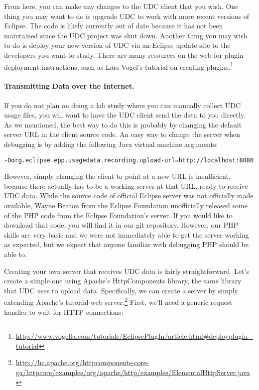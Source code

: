 From here, you can make any changes to the UDC client that you wish.
One thing you may want to do is upgrade UDC to work with more recent versions
of Eclipse.
The code is likely currently out of date
because it has not been maintained since the UDC project was shut down.
Another thing you may wish to do is deploy your new version of UDC via
an Eclipse update site to the developers you want to study.
There are many resources on the web for plugin deployment instructions,
such as Lars Vogel's tutorial on creating 
plugins.\footnote{\url{http://www.vogella.com/tutorials/EclipsePlugIn/article.html#deployplugin_tutorial}}

\paragraph{Transmitting Data over the Internet.}

If you do not plan on doing a lab study where you can manually collect UDC usage
files, you will want to have the UDC client send the data to you directly.
As we mentioned, the best way to do this is probably by changing the default
server URL in the client source code.
An easy way to change the server when debugging is by adding the following Java
virtual machine arguments:

\vspace{4mm}
\texttt{-Dorg.eclipse.epp.usagedata.recording.upload-url=http://localhost:8080}
\vspace{4mm}

\noindent
However, simply changing the client to point at a new URL is insufficient, 
because there actually has to be a working server at that URL, ready to 
receive UDC data.
While the source code of official Eclipse server was not officially made 
available, Wayne Beaton from the Eclipse Foundation unofficially released
some of the PHP code from the Eclipse Foundation's server.
If you would like to download that code, you will find it in our git repository.
However, our PHP skills are very basic and we were not immediately able
to get the server working as expected, but we expect that anyone familiar with
debugging PHP should be able to.

\newpage

Creating your own server that receives UDC data is fairly straightforward.
Let's create a simple one using Apache's HttpComponents library,
the same library that UDC uses to upload data.
Specifically, we can create a server by simply extending Apache's tutorial
web server.\footnote{\url{http://hc.apache.org/httpcomponents-core-ga/httpcore/examples/org/apache/http/examples/ElementalHttpServer.java}}
First, we'll need a generic request handler to wait for HTTP connections:

